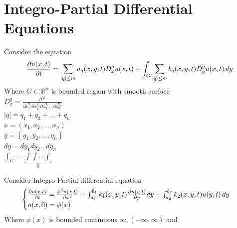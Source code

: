 \section{Integro-Partial Differential Equations}
Consider the equation
\begin{equation*}
    \pdv{u(x,t)}{t} = \sum_{|q|\leq m} a_q(x,y,t) D_{x}^{q} u(x,t) + \int_G \sum_{|q|\leq m} b_q(x,y,t) D_{y}^{q} u(x,t) \, dy
\end{equation*}
Where $G \subset \mathbb{R}^n$ is bounded region with smooth surface\\
$D_{x}^{q} = \frac{\partial^{|q|}}{\partial x_{1}^{q_1}\partial x_{2}^{q_2}\partial x_{3}^{q_3}\dots \partial x_{n}^{q_n}} $\\
$|q|=q_1 + q_2 + \dots + q_n$\\
$x=(x_1,x_2,\dots, x_n)$\\
$y=(y_1,y_2,\dots ,y_n)$\\
$dy = dy_1 dy_2 \dots dy_n$\\
$\int_G = \underbrace{\int\int \dots \int}_{\textit{n}}$\\
\begin{example}
    Consider Integro-Partial differential equation
    \begin{equation*}
        \begin{cases}
            \pdv{u(x,t)}{t}=\pdv[2]{u(x,t)}{x} + \int_{a_1}^{b_1} k_1(x,y,t) \pdv{u(y,t)}{y} dy + \int_{a_2}^{b_2}k_2(x,y,t)u(y,t) \, dy
            \\
            u(x,0)=\phi(x)
        \end{cases}
    \end{equation*}
    Where $\phi(x)$ is bounded continuous on $(-\infty,\infty)$ and
\end{example}



